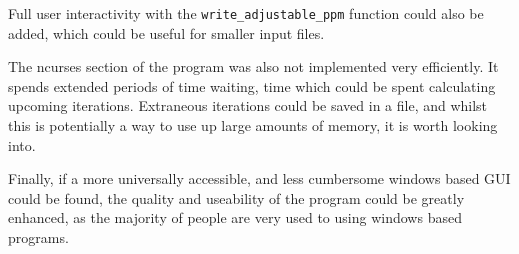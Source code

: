 	Full user interactivity with the \texttt{write\_adjustable\_ppm} function could also be added, which could be useful for smaller input files.

	The ncurses section of the program was also not implemented very efficiently.
	It spends extended periods of time waiting, time which could be spent calculating upcoming iterations.
	Extraneous iterations could be saved in a file, and whilst this is potentially a way to use up large amounts of memory, it is worth looking into.
	
	Finally, if a more universally accessible, and less cumbersome windows based GUI could be found, the quality and useability of the program could be greatly enhanced, as the majority of people are very used to using windows based programs.
